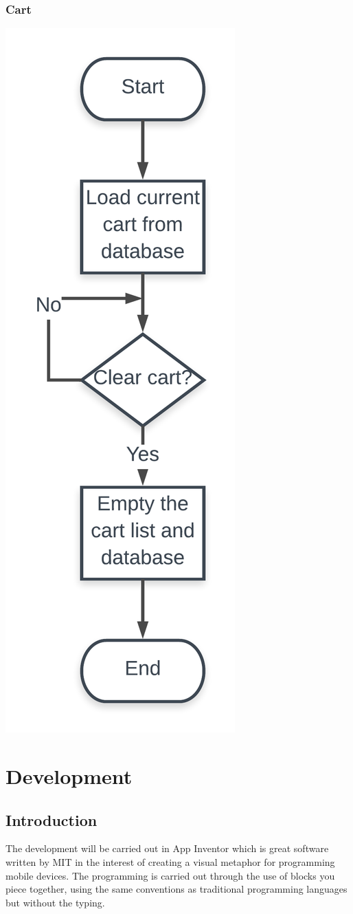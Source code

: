 \documentclass{scrreprt}
\begin{document}
\subsection*{Cart}

\begin{center}
    \includegraphics[width=0.4\linewidth]{images/flowCart.png}
\end{center}

\chapter{Development}\label{development}

\section{Introduction}

The development will be carried out in App Inventor which is great software written by MIT in the interest of creating a visual metaphor for programming mobile devices. The programming is carried out through the use of blocks you piece together, using the same conventions as traditional programming languages but without the typing.
\end{document}
